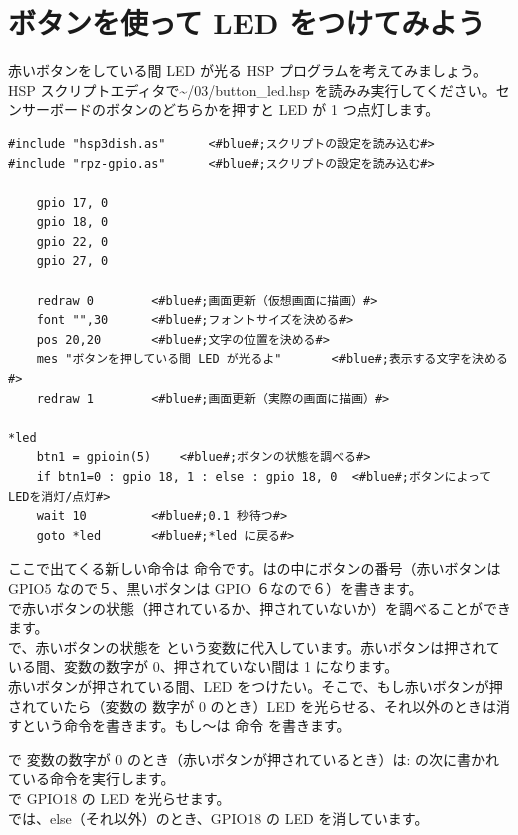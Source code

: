 \documentclass[text03.tex]{subfiles}
\begin{document}
\newpage
\section{ボタンを使って LED をつけてみよう}
赤いボタンをしている間 LED が光る HSP プログラムを考えてみましょう。HSP スクリプトエディタで\textasciitilde /03/button\_led.hsp を読みみ実行してください。センサーボードのボタンのどちらかを押すと LED が 1 つ点灯します。\\

\begin{lstlisting}[caption=\textasciitilde/03/button\_led.hsp,label=button_led.hsp]
#include "hsp3dish.as"		<#blue#;スクリプトの設定を読み込む#>
#include "rpz-gpio.as"		<#blue#;スクリプトの設定を読み込む#>

	gpio 17, 0
	gpio 18, 0
	gpio 22, 0
	gpio 27, 0
   
	redraw 0		<#blue#;画面更新（仮想画面に描画）#>
	font "",30		<#blue#;フォントサイズを決める#>
	pos 20,20		<#blue#;文字の位置を決める#>
	mes "ボタンを押している間 LED が光るよ"		<#blue#;表示する文字を決める#>
	redraw 1		<#blue#;画面更新（実際の画面に描画）#>

*led
	btn1 = gpioin(5) 	<#blue#;ボタンの状態を調べる#>
	if btn1=0 : gpio 18, 1 : else : gpio 18, 0 	<#blue#;ボタンによってLEDを消灯/点灯#>
	wait 10 		<#blue#;0.1 秒待つ#>
	goto *led 		<#blue#;*led に戻る#>
\end{lstlisting}

ここで出てくる新しい命令は  命令です。は\code{()}の中にボタンの番号（赤いボタンは
GPIO5 なので５、黒いボタンは GPIO ６なので６）を書きます。\\

で赤いボタンの状態（押されているか、押されていないか）を調べることができます。\\
で、赤いボタンの状態を  という変数に代入しています。赤いボタンは押されている間、変数の数字が 0、押されていない間は 1 になります。\\

赤いボタンが押されている間、LED をつけたい。そこで、もし赤いボタンが押されていたら（変数の
数字が 0 のとき）LED を光らせる、それ以外のときは消すという命令を書きます。もし～は  命令
を書きます。

 で  変数の数字が 0 のとき（赤いボタンが押されているとき）は\code{ }: の次に書かれている命令を実行します。\\
 で GPIO18 の LED を光らせます。\\
 では、else（それ以外）のとき、GPIO18 の LED を消しています。\\
\end{document}

